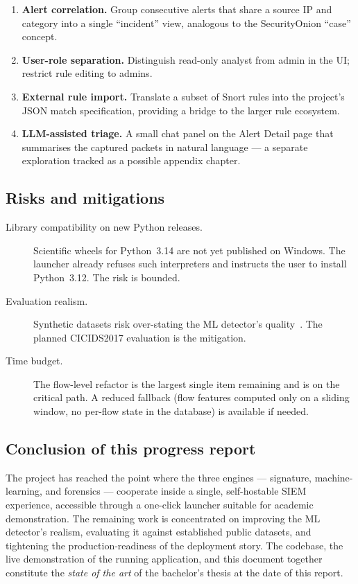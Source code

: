 \begin{enumerate}
    \item \textbf{Alert correlation.} Group consecutive alerts that
        share a source IP and category into a single ``incident'' view,
        analogous to the SecurityOnion ``case'' concept.
    \item \textbf{User-role separation.} Distinguish read-only analyst
        from admin in the UI; restrict rule editing to admins.
    \item \textbf{External rule import.} Translate a subset of Snort
        rules into the project's JSON match specification, providing a
        bridge to the larger rule ecosystem.
    \item \textbf{LLM-assisted triage.} A small chat panel on the
        Alert Detail page that summarises the captured packets in
        natural language --- a separate exploration tracked as a
        possible appendix chapter.
\end{enumerate}

\subsection{Risks and mitigations}

\begin{description}
    \item[Library compatibility on new Python releases.] Scientific
        wheels for Python~3.14 are not yet published on Windows. The
        launcher already refuses such interpreters and instructs the
        user to install Python~3.12. The risk is bounded.
    \item[Evaluation realism.] Synthetic datasets risk over-stating
        the ML detector's quality~\cite{sommer2010outside}. The planned
        CICIDS2017 evaluation is the mitigation.
    \item[Time budget.] The flow-level refactor is the largest single
        item remaining and is on the critical path. A reduced fallback
        (flow features computed only on a sliding window, no
        per-flow state in the database) is available if needed.
\end{description}

\subsection{Conclusion of this progress report}

The project has reached the point where the three engines --- signature,
machine-learning, and forensics --- cooperate inside a single,
self-hostable SIEM experience, accessible through a one-click launcher
suitable for academic demonstration. The remaining work is concentrated
on improving the ML detector's realism, evaluating it against
established public datasets, and tightening the production-readiness of
the deployment story. The codebase, the live demonstration of the
running application, and this document together constitute the
\textit{state of the art} of the bachelor's thesis at the date of this
report.
